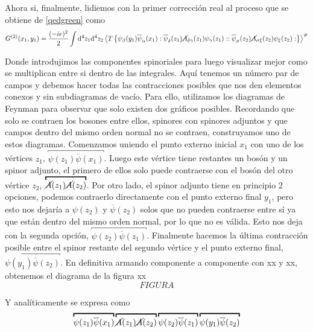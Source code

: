 \documentclass{article}
\numberwithin{equation}{section}
\begin{document}
Ahora si, finalmente,
lidiemos con la primer corrección real al proceso que se obtiene de \ref{qedgreen} como
\begin{equation}\label{g2}
G^{(2)}(x_{1},y_{1})=\frac{(-ie)^{2}}{2}\int \mathrm{d^4}z_{1}\mathrm{d^4}z_{2}\left\langle T\left\{ \psi_{\beta}(y_{1})\overline{\psi}_{\alpha}(x_{1}):\overline{\psi}_{\delta}(z_{1})\cancel{A}_{\delta\gamma}(z_{1})\psi_{\gamma}(z_{1})::\overline{\psi}_{\sigma}(z_{2})\cancel{A}_{\sigma\xi}(z_{2})\psi_{\xi}(z_{2}):\right\} \right\rangle ^{\#}
\end{equation}

Donde introdujimos las componentes spinoriales para luego visualizar mejor como se multiplican entre si dentro de las integrales. Aquí tenemos un número par de campos y debemos hacer todas las
contracciones posibles que nos den elementos conexos y sin subdiagramas
de vacío. Para ello, utilizamos los diagramas de Feynman para observar
que solo existen dos gráficos posibles. Recordando que solo se contraen
los bosones entre ellos, spinores con spinores adjuntos y que campos
dentro del mismo orden normal no se contraen, construyamos uno de
estos diagramas. Comenzamos uniendo el punto externo inicial $x_{1}$
con uno de los vértices $z_{1}$, $\overbracket{\psi(z_{1})\overline{\psi}(x_{1})}$.
Luego este vértice tiene restantes un bosón y un spinor adjunto, el
primero de ellos solo puede contraerse con el bosón del otro vértice
$z_{2}$, $\overbracket{\cancel{A}(z_{1})\cancel{A}(z_{2})}$. Por otro lado, el
spinor adjunto tiene en principio 2 opciones, podemos contraerlo directamente
con el punto externo final $y_{1}$, pero esto nos dejaría a $\psi(z_{2})$
y $\overline{\psi}(z_{2})$ solos que no pueden contraerse entre sí
ya que están dentro del mismo orden normal, por lo que no es válida.
Esto nos deja con la segunda opción, $\overbracket{\psi(z_{2})\overline{\psi}(z_{1})}$.
Finalmente hacemos la última contracción posible entre el spinor restante
del segundo vértice y el punto externo final, $\overbracket{\psi(y_{1})\overline{\psi}(z_{2})}$.
En definitiva armando componente a componente con xx y xx, obtenemos
el diagrama de la figura xx
\begin{equation}
FIGURA
\end{equation}

Y analíticamente se expresa como 
\begin{equation}\label{feyng2}
\overbracket{\psi(z_{1})\overline{\psi}(x_{1})}\overbracket{\cancel{A}(z_{1})\cancel{A}(z_{2})}\overbracket{\psi(z_{2})\overline{\psi}(z_{1})}\overbracket{\psi(y_{1})\overline{\psi}(z_{2})}
\end{equation}
\end{document}
